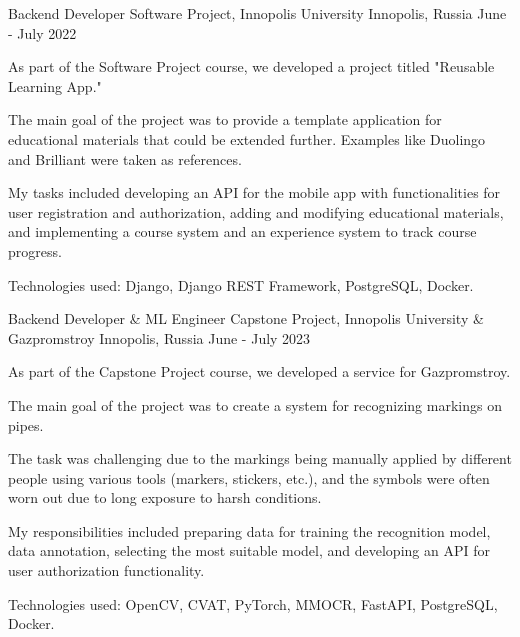 \begin{cventries}
\cventry
    {Backend Developer} %
    {Software Project, Innopolis University} %
    {Innopolis, Russia} %
    {June - July 2022} %
    {
      \begin{cvitems} %
        \item {As part of the Software Project course, we developed a project titled "Reusable Learning App."}
        \item {The main goal of the project was to provide a template application for educational materials that could be extended further. Examples like Duolingo and Brilliant were taken as references.}
        \item {My tasks included developing an API for the mobile app with functionalities for user registration and authorization, adding and modifying educational materials, and implementing a course system and an experience system to track course progress.}
        \item {Technologies used: Django, Django REST Framework, PostgreSQL, Docker.}
      \end{cvitems}
    }

\cventry
    {Backend Developer \& ML Engineer} %
    {Capstone Project, Innopolis University \& Gazpromstroy} %
    {Innopolis, Russia} %
    {June - July 2023} %
    {
      \begin{cvitems} %
        \item {As part of the Capstone Project course, we developed a service for Gazpromstroy.}
        \item {The main goal of the project was to create a system for recognizing markings on pipes.}
        \item {The task was challenging due to the markings being manually applied by different people using various tools (markers, stickers, etc.), and the symbols were often worn out due to long exposure to harsh conditions.}
        \item {My responsibilities included preparing data for training the recognition model, data annotation, selecting the most suitable model, and developing an API for user authorization functionality.}
        \item {Technologies used: OpenCV, CVAT, PyTorch, MMOCR, FastAPI, PostgreSQL, Docker.}
      \end{cvitems}
    }
  

\end{cventries}
